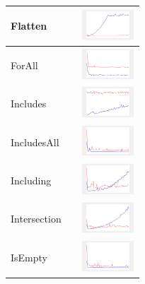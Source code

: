 \begin{longtable}{ m{2.5cm} m{8cm} m{2cm} }
Flatten &

&
\includegraphics[width=2cm]{graphs/set/small/Flatten}
\\\hline

ForAll &

&
\includegraphics[width=2cm]{graphs/set/small/forALL}
\\\hline

Includes &

&
\includegraphics[width=2cm]{graphs/set/small/Includes}
\\\hline

IncludesAll &

&
\includegraphics[width=2cm]{graphs/set/small/IncludesAll}
\\\hline

Including &

&
\includegraphics[width=2cm]{graphs/set/small/Including}
\\\hline

Intersection &

&
\includegraphics[width=2cm]{graphs/set/small/Intersection}
\\\hline

IsEmpty &

&
\includegraphics[width=2cm]{graphs/set/small/IsEmpty}
\\\hline


\end{longtable}
